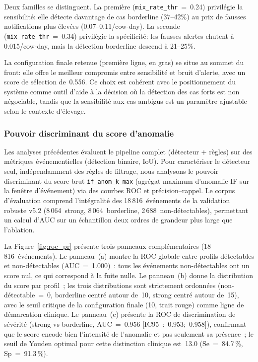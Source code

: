 Deux familles se distinguent. La première (\texttt{mix\_rate\_thr}~=~0.24) privilégie
la sensibilité: elle détecte davantage de cas borderline (37--42\%) au prix
de fausses notifications plus élevées (0.07--0.11/cow-day). La seconde
(\texttt{mix\_rate\_thr}~=~0.34) privilégie la spécificité: les fausses alertes chutent
à 0.015/cow-day, mais la détection borderline descend à 21--25\%.

La configuration finale retenue (première ligne, en gras) se situe au sommet du front:
elle offre le meilleur compromis entre sensibilité et bruit d'alerte, avec un score de
sélection de~0.556. Ce choix est cohérent avec le positionnement du système comme outil
d'aide à la décision où la détection des cas forts est non négociable, tandis que la
sensibilité aux cas ambigus est un paramètre ajustable selon le contexte d'élevage.

\FloatBarrier
\subsubsection{Pouvoir discriminant du score d'anomalie}
\label{subsubsec:roc_pr}

Les analyses précédentes évaluent le pipeline complet (détecteur $+$ règles) sur des
métriques événementielles (détection binaire, IoU). Pour caractériser le détecteur
seul, indépendamment des règles de filtrage, nous analysons le pouvoir discriminant
du score brut \texttt{if\_anom\_k\_max} (agrégat maximum d'anomalie IF sur la fenêtre
d'événement) via des courbes ROC et précision--rappel. Le corpus d'évaluation
comprend l'intégralité des 18\,816~événements de la validation robuste v5.2
(8\,064~strong, 8\,064~borderline, 2\,688~non-détectables), permettant un calcul
d'AUC sur un échantillon deux ordres de grandeur plus large que l'ablation.

La Figure~\ref{fig:roc_pr} présente trois panneaux complémentaires (18\,816~événements).
Le panneau~(a) montre la ROC globale entre profils détectables et non-détectables
(AUC~=~1.000)~: tous les événements non-détectables ont un score nul, ce qui correspond
à la fuite nulle. Le panneau~(b) donne la distribution du score par profil~; les trois
distributions sont strictement ordonnées (non-détectable~=~0, borderline centré autour
de~10, strong centré autour de~15), avec le seuil critique de la configuration finale
(10, trait rouge) comme ligne de démarcation clinique. Le panneau~(c) présente la ROC de
discrimination de sévérité (strong vs borderline, AUC~=~0.956 [IC95~:~0.953;~0.958]),
confirmant que le score encode bien l'intensité de l'anomalie et pas seulement sa
présence~; le seuil de Youden optimal pour cette distinction clinique est~13.0
(Se~=~84.7\,\%, Sp~=~91.3\,\%).


